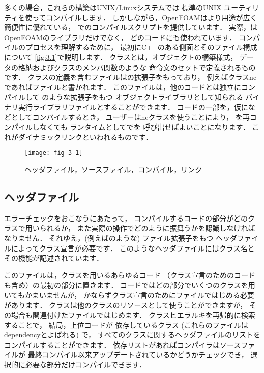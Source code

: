 多くの場合，これらの構築はUNIX/Linuxシステムでは
標準のUNIX
%
%
ユーティリティを使ってコンパイルします．
しかしながら，OpenFOAMはより用途が広く簡便性に優れている，
%
%
でのコンパイルスクリプトを提供しています．
実際，はOpenFOAMのライブラリだけでなく，
どのコードにも使われています．
コンパイルのプロセスを理解するために，
最初にC++のある側面とそのファイル構成について
\autoref{fig:3.1}で説明します．
クラスとは，オブジェクトの構築様式，
データの格納およびクラスのメンバ関数のような
命令文のセットで定義されるものです．
クラスの定義を含むファイルはの拡張子をもっており，
例えばクラスncであればファイルと書かれます．
このファイルは，他のコードとは独立にコンパイルして
のような拡張子をもつ
オブジェクトライブラリとして知られる
バイナリ実行ライブラリファイルとすることができます．
コードの一部を，仮になどとしてコンパイルするとき，
ユーザーはncクラスを使うことにより，
を再コンパイルしなくても
ランタイムとしてでを
呼び出せばよいことになります．
これがダイナミックリンクといわれるものです．


\begin{figure}[ht]
 \texttt{[image: fig-3-1]}
 \caption{ヘッダファイル，ソースファイル，コンパイル，リンク}
 \label{fig:3.1}
\end{figure}


\subsection{ヘッダファイル}
\label{ssec:3.2.1}
エラーチェックをおこなうにあたって，
コンパイルするコードの部分がどのクラスで用いられるか，
また実際の操作でどのように振舞うかを認識しなければなりません．
それゆえ，(例えばのような) ファイル拡張子をもつ
ヘッダファイルによってクラス宣言が必要です．
このようなヘッダファイルにはクラス名とその機能が記述されています．

このファイルは，クラスを用いるあらゆるコード
（クラス宣言のためのコードも含め）の最初の部分に置きます．
コードではどの部分でいくつのクラスを用いてもかまいませんが，
かならずクラス宣言のためにファイルではじめる必要があります．
クラスは他のクラスのリソースとして使うことができますが，
その場合も関連付けたファイルではじめます．
クラスヒエラルキを再帰的に検索することで，
結局，上位コードが
%
依存しているクラス
(これらのファイルはdependencyとよばれる) で，
すべてのクラスに関するヘッダファイルのリストを
コンパイルすることができます．
%
依存リストがあればコンパイラはソースファイルが
最終コンパイル以来アップデートされているかどうかチェックでき，
選択的に必要な部分だけコンパイルできます．

